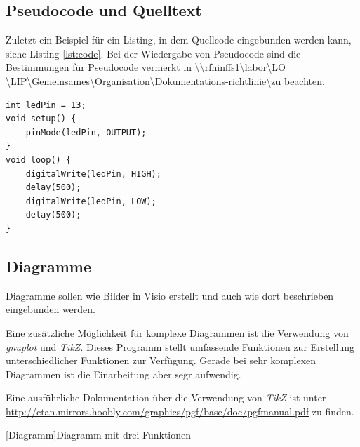 \documentclass[12pt,a4paper, listof=entryprefix, bibliography=totocnumbered,toc=listofnumbered,lof=listofnumbered]{scrartcl}
\begin{document}
\subsection{Pseudocode und Quelltext}
\label{ch:code}
Zuletzt ein Beispiel für ein Listing, in dem Quellcode eingebunden werden kann, siehe Listing \ref{lst:code}. Bei der Wiedergabe von Pseudocode sind die Bestimmungen für Pseudocode vermerkt in
\textbackslash\textbackslash rfhinffs1\textbackslash labor\textbackslash LO \textbackslash LIP\textbackslash Gemeinsames\textbackslash Organisation\textbackslash Dokumentations-richtlinie\textbackslash zu beachten.

\vspace{1em}
\begin{lstlisting}[caption= Beispielprogramm, label=lst:code]
int ledPin = 13;
void setup() {
    pinMode(ledPin, OUTPUT);
}
void loop() {
    digitalWrite(ledPin, HIGH);
    delay(500);
    digitalWrite(ledPin, LOW);
    delay(500);
}
\end{lstlisting}

\subsection{Diagramme}
\label{ch:diagramm}
Diagramme sollen wie Bilder in Visio erstellt und auch wie dort beschrieben eingebunden werden.

Eine zusätzliche Möglichkeit für komplexe Diagrammen ist die  Verwendung von \textit{gnuplot} und \textit{TikZ}. Dieses Programm stellt umfassende Funktionen zur Erstellung unterschiedlicher Funktionen zur Verfügung. Gerade bei sehr komplexen Diagrammen ist die Einarbeitung aber segr aufwendig.

Eine ausführliche Dokumentation über die Verwendung von \textit{TikZ} ist unter \url{http://ctan.mirrors.hoobly.com/graphics/pgf/base/doc/pgfmanual.pdf} zu finden.

\begin{center} 
\label{fig:diagramm}
[Diagramm]{Diagramm mit drei Funktionen}
\end{center}
\end{document}
